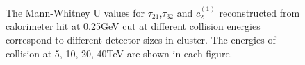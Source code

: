 \documentclass[final,1p,11pt]{elsarticle}
\begin{document}
\begin{figure}
\begin{center}
\end{center}
\caption{The Mann-Whitney U values for $\tau_{21}$,$\tau_{32}$ and $c_2^{(1)}$ reconstructed from calorimeter hit at 0.25GeV cut at different collision energies correspond to different detector sizes in cluster. The energies of collision at 5, 10, 20, 40TeV are shown in each figure.}
\label{fig:cluster_U_summary}
\end{figure}
\end{document}
